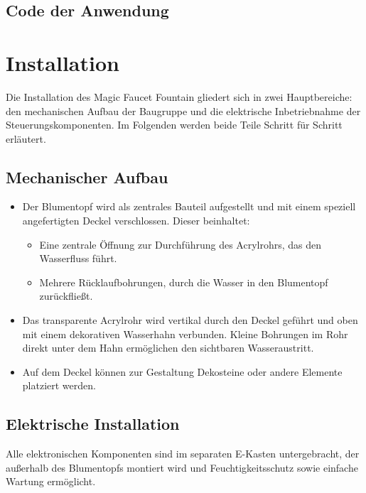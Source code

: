 \subsection{Code der Anwendung}
\begin{code}[H]
	\label{code:codeApplikation}
\end{code}

\section{Installation}
Die Installation des Magic Faucet Fountain gliedert sich in zwei Hauptbereiche: den mechanischen Aufbau der Baugruppe und die elektrische Inbetriebnahme der Steuerungskomponenten. Im Folgenden werden beide Teile Schritt für Schritt erläutert.

\subsection{Mechanischer Aufbau}
\begin{itemize}
	\item Der Blumentopf wird als zentrales Bauteil aufgestellt und mit einem speziell angefertigten Deckel verschlossen. Dieser beinhaltet:
	\begin{itemize}
        	\item Eine zentrale Öffnung zur Durchführung des Acrylrohrs, das den Wasserfluss führt.
        	\item Mehrere Rücklaufbohrungen, durch die Wasser in den Blumentopf zurückfließt.
	\end{itemize}
	\item Das transparente Acrylrohr wird vertikal durch den Deckel geführt und oben mit einem dekorativen Wasserhahn verbunden. Kleine Bohrungen im Rohr direkt unter dem Hahn ermöglichen den sichtbaren Wasseraustritt.
	\item Auf dem Deckel können zur Gestaltung Dekosteine oder andere Elemente platziert werden.
\end{itemize}

\subsection{Elektrische Installation}
Alle elektronischen Komponenten sind im separaten E-Kasten untergebracht, der außerhalb des Blumentopfs montiert wird und Feuchtigkeitsschutz sowie einfache Wartung ermöglicht.

